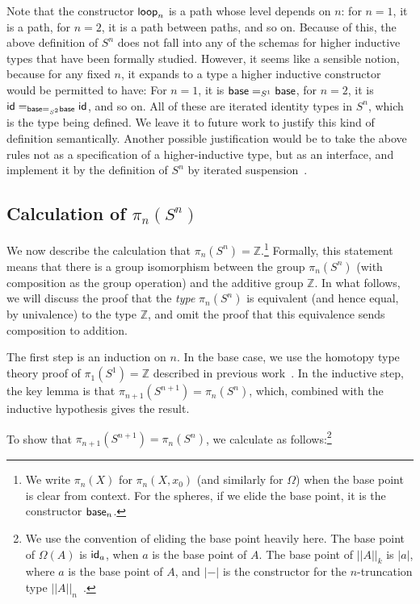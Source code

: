 Note that the constructor $\mathsf{loop}_n$ is a path whose level depends
on $n$: for $n = 1$, it is a path, for $n = 2$, it is a path between
paths, and so on.  Because of this, the above definition of $S^n$ does
not fall into any of the schemas for higher inductive types that have
been formally studied.  However, it seems like a sensible notion,
because for any fixed $n$, it expands to a type a higher inductive
constructor would be permitted to have: For $n = 1$, it is $\mathsf{base}
=_{S^1} \mathsf{base}$, for $n=2$, it is $\mathsf{id} =_{\mathsf{base} =_{S^2}
  \mathsf{base}} \mathsf{id}$, and so on.  All of these are iterated identity
types in $S^n$, which is the type being defined.  We leave it to future
work to justify this kind of definition semantically.  Another
possible justification would be to take the above rules not as a specification of a
higher-inductive type, but as an interface, and implement it by the
 definition of $S^n$ by iterated suspension~\citep[Section 6.5]{uf13hott-book}.  

\subsection{Calculation of $\pi_n(S^n)$}

We now describe the calculation that $\pi_n(S^n) = \mathbb{Z}$.\footnote{We
write $\pi_n(X)$ for $\pi_n(X,x_0)$ (and similarly for $\Omega$) when the
base point is clear from context.  For the spheres, if we elide the base
point, it is
the constructor $\mathsf{base}_n$.}  Formally, this statement means
that there is a group isomorphism between the group $\pi_n(S^n)$ (with
composition as the group operation) and the additive group
$\mathbb{Z}$.  In what follows, we will discuss the proof that the
\emph{type} $\pi_n(S^n)$ is equivalent (and hence equal, by univalence) to the
type $\mathbb{Z}$, and omit the proof that this equivalence sends
composition to addition.   

The
first step is an induction on $n$.  In the base case, we use the
homotopy type theory proof of $\pi_1(S^1) = \mathbb{Z}$ described in
previous work~\citep{ls13pi1s1}.  In the inductive step, the key lemma
is that $\pi_{n+1}(S^{n+1}) = \pi_n(S^n)$, which, combined with the
inductive hypothesis gives the result.  

To show that $\pi_{n+1}(S^{n+1}) = \pi_n(S^n)$, we calculate as
follows:\footnote{We use the convention of eliding the base point
  heavily here.  The base point of $\Omega(A)$ is $\mathsf{id}_a$, when
  $a$ is the base point of $A$.  The base point of $||A||_k$ is $|a|$,
  where $a$ is the base point of $A$, and $|-|$ is the constructor for
  the $n$-truncation type $||A||_n$~\citep[Section 7.3]{uf13hott-book}.}

